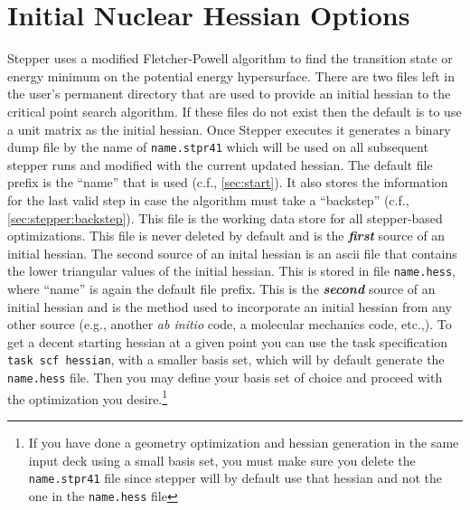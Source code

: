 \section{Initial Nuclear Hessian Options}
Stepper uses a modified Fletcher-Powell algorithm to find the
transition state or energy minimum on the potential energy
hypersurface.  There are two files left in the user's permanent
directory that are used to provide an initial hessian to the critical
point search algorithm.  If these files do not exist then the default
is to use a unit matrix as the initial hessian.  Once Stepper executes
it generates a binary dump file by the name of \verb+name.stpr41+
which will be used on all subsequent stepper runs and modified with
the current updated hessian.  The default file prefix is the ``name''
that is used (c.f., \ref{sec:start}). It also stores the information
for the last valid step in case the algorithm must take a ``backstep''
(c.f., \ref{sec:stepper:backstep}).  This file is the working data
store for all stepper-based optimizations.  This file is never deleted
by default and is the {\bf\it first} source of an initial hessian.
The second source of an inital hessian is an ascii file that contains
the lower triangular values of the initial hessian.  This is stored in
file \verb+name.hess+, where ``name'' is again the default file
prefix.  This is the {\bf\it second} source of an initial hessian and
is the method used to incorporate an initial hessian from any other
source (e.g., another {\it ab initio} code, a molecular mechanics
code, etc.,).  To get a decent starting hessian at a given point you
can use the task specification {\tt  task scf hessian}, with a smaller
basis set, which will by default generate the {\tt  name.hess} file.
Then you may define your basis set of choice and proceed with the
optimization you desire.\footnote{If you have done a geometry
optimization and hessian generation in the same input deck using a
small basis set, you must make sure you delete the {\tt  name.stpr41}
file since stepper will by default use that hessian and not the one in
the {\tt  name.hess} file}

